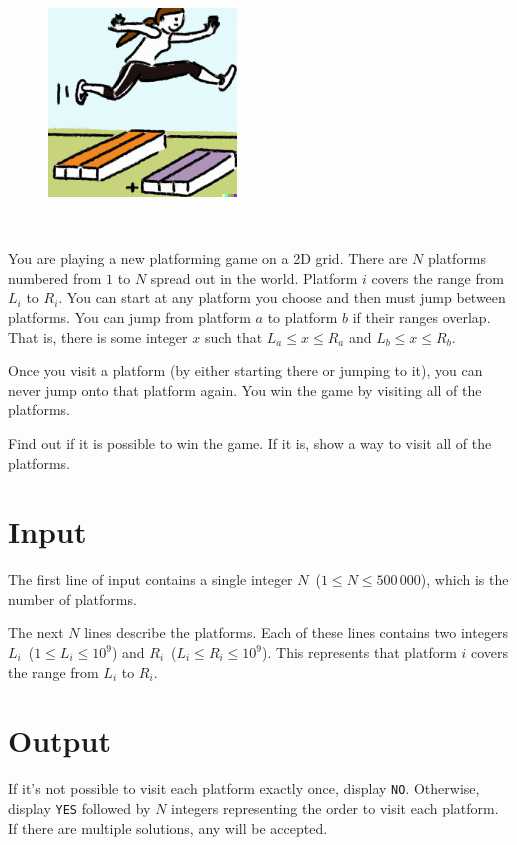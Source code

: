 
\begin{figure}
 \includegraphics[width=50mm]{img.png}
\end{figure}
~

You are playing a new platforming game on a 2D grid. There are $N$ platforms numbered from $1$ to $N$ spread out in the world. Platform $i$ covers the range from $L_i$ to $R_i$. You can start at any platform you choose and then must jump between platforms. You can jump from platform $a$ to platform $b$ if their ranges overlap. That is, there is some integer $x$ such that $L_a \leq x \leq R_a$ and $L_b \leq x \leq R_b$.

Once you visit a platform (by either starting there or jumping to it), you can never jump onto that platform again. You win the game by visiting all of the platforms.

Find out if it is possible to win the game. If it is, show a way to visit all of the platforms.


\section*{Input}

The first line of input contains a single integer $N$~($1 \leq N \leq 500\,000$), which is the number of platforms.

The next $N$ lines describe the platforms. Each of these lines contains two integers $L_i$~($1 \leq L_i \leq 10^9$) and $R_i$~($L_i \leq R_i \leq 10^9$). This represents that platform $i$ covers the range from $L_i$ to $R_i$.


\section*{Output}

If it's not possible to visit each platform exactly once, display \texttt{NO}. Otherwise, display \texttt{YES} followed by $N$ integers representing the order to visit each platform. If there are multiple solutions, any will be accepted.

